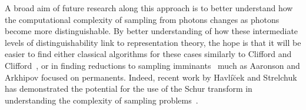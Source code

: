 A broad aim of future research along this approach is to better understand how the computational complexity of sampling from photons changes as photons become more distinguishable. 
By better understanding of how these intermediate levels of distinguishability link to representation theory, the hope is that it will be easier to find either classical algorithms for these cases similarly to Clifford and Clifford~\cite{clifford2017}, or in finding reductions to sampling imminants~\cite{mertens2013} much as Aaronson and Arkhipov focused on permanents. 
Indeed, recent work by Havl\'{i}\u{c}ek and Strelchuk has demonstrated the potential for the use of the Schur transform in understanding the complexity of sampling problems~\cite{havlicek2018}.
